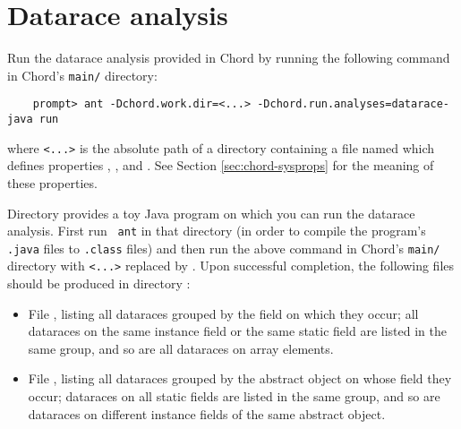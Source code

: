 \section{Datarace analysis}
\label{sec:datarace}

Run the datarace analysis provided in Chord by running the following
command in Chord's {\tt main/} directory:

\begin{verbatim}
    prompt> ant -Dchord.work.dir=<...> -Dchord.run.analyses=datarace-java run
\end{verbatim}

\noindent where {\tt <...>} is the absolute path of a directory
containing a file named  which defines
properties , , and
.  See Section \ref{sec:chord-sysprops} for the
meaning of these properties.

Directory  provides a toy Java
program on which you can run the datarace analysis.  First run {\tt
  ant} in that directory (in order to compile the program's {\tt
  .java} files to {\tt .class} files) and then run the above command
in Chord's {\tt main/} directory with {\tt <...>} replaced by
.  Upon successful completion, the
following files should be produced in directory
:

\begin{itemize}
\item
File , listing all dataraces grouped by
the field on which they occur; all dataraces on the same instance
field or the same static field are listed in the same group, and so
are all dataraces on array elements.
\item
File , listing all dataraces grouped by
the abstract object on whose field they occur; dataraces on all static
fields are listed in the same group, and so are dataraces on different
instance fields of the same abstract object.
\end{itemize}


